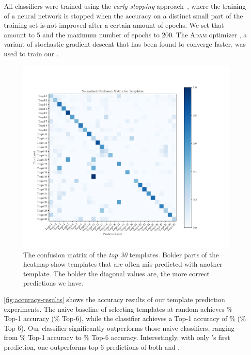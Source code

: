 All classifiers were trained using the \emph{early stopping} approach~\cite{FIXME},
where the
training of a neural network is stopped when the accuracy on a distinct small
part of the training set is not improved after a certain amount of epochs. We
set that amount to 5 and the maximum number of epochs to 200. The \textsc{Adam}
optimizer \citep{Kingma2014-ng}, a variant of stochastic gradient descent that
has been found to converge faster, was used to train our \dnn.



\begin{figure}[t]
  \centering
  \includegraphics[trim={30 40 100 70},clip,width=\linewidth]{evaluation-conf-matrix.pdf}
  \caption{The confusion matrix of the \emph{top 30} templates. Bolder parts of
  the heatmap show templates that are often mis-predicted with another template.
  The bolder the diagonal values are, the more correct predictions we have.}
  \label{fig:conf-matrix}
\end{figure}

\autoref{fig:accuracy-results} shows the accuracy results of our template
prediction experiments. The naive baseline of selecting templates at random
achieves \RandomTopOne\% Top-1 accuracy (\RandomTopSix\% Top-6), while the
 \popular
classifier achieves a Top-1 accuracy of \PopularTopOne\% (\PopularTopSix\%
Top-6). Our \dnn classifier significantly outperforms those naive classifiers,
ranging from \DnnTopOne\% Top-1 accuracy to \DnnTopSix\% Top-6 accuracy.
Interestingly, with only \dnn's first prediction, one outperforms top 6
predictions of both \random and \popular.

